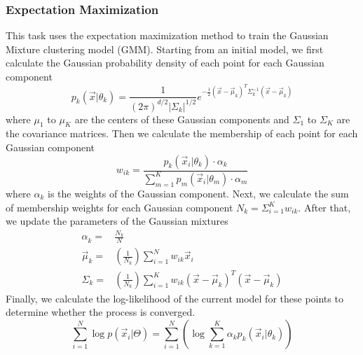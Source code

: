 \subsubsection{Expectation Maximization}

This task uses the expectation maximization method to train the Gaussian Mixture clustering model (GMM).
Starting from an initial model, we first calculate the Gaussian probability density of each point for each Gaussian component
\begin{equation}
    \label{eq:prob}
    p _{ k } \left( \vec{ x } | \theta _{ k } \right) = \frac{ 1 }{ \left( 2 \pi \right) ^{ d / 2 } \left| \Sigma _{ k } \right| ^{ 1 / 2 } } e ^{ - \frac{ 1 }{ 2 } \left( \vec{ x } - \vec{ \mu } _{ k } \right) ^{ T } \Sigma _{ k } ^{ - 1 } \left( \vec{ x } - \vec{ \mu } _{ k } \right) }
\end{equation}
where $\mu_1$ to $\mu_K$ are the centers of these Gaussian components and $\Sigma_1$ to $\Sigma_K$ are the covariance matrices.
Then we calculate the membership of each point for each Gaussian component
\begin{equation}
    \label{eq:membership}
    w _{ i k } = \frac{ p _{ k } \left( \vec{ x } _{ i } | \theta _{ k } \right) \cdot \alpha _{ k } }{ \sum _{ m = 1 } ^{ K } p _{ m } \left( \vec{ x } _{ i } | \theta _{ m } \right) \cdot \alpha _{ m } }
\end{equation}
where $\alpha_k$ is the weights of the Gaussian component.
Next, we calculate the sum of membership weights for each Gaussian component $N_k=\Sigma_{i=1}^K w_{ik}$.
After that, we update the parameters of the Gaussian mixtures
\begin{align}
    \alpha _{ k } ^{ } =& \frac{ N _{ k } }{ N }\\
    \label{eq:mu}
    \vec{ \mu } _{ k } =& \left( \frac{ 1 }{ N _{ k } } \right) \sum _{ i = 1 } ^{ N } w _{ i k } \vec{ x } _{ i }\\
    \label{eq:sigma}
    \Sigma _{ k } =& \left( \frac{ 1 }{ N _{ k } } \right) \sum _{ i = 1 } ^{ K } w _{ i k } \left( \vec{ x } - \vec{ \mu } _{ k } \right) ^{ T } \left( \vec{ x } - \vec{ \mu } _{ k } \right)
\end{align}
Finally, we calculate the log-likelihood of the current model for these points to determine whether the process is converged.
\begin{equation}
    \label{eq:log}
    \sum _{ i = 1 } ^{ N } \log p \left( \vec{ x } _{ i } | \Theta \right) = \sum _{ i = 1 } ^{ N } \left( \log \sum _{ k = 1 } ^{ K } \alpha _{ k } p _{ k } \left( \vec{ x } _{ i } | \theta _{ k } \right) \right)
\end{equation}

